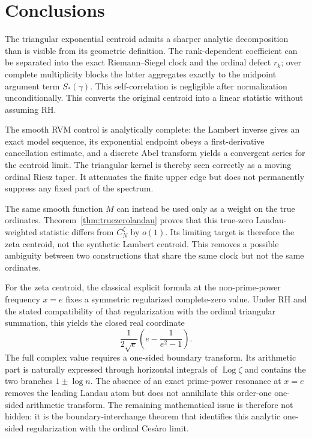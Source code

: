 \documentclass[11pt]{amsart}
\numberwithin{equation}{section}
\theoremstyle{definition}
\theoremstyle{remark}
\newcommand{\Log}{\operatorname{Log}}
\begin{document}
\section{Conclusions}\label{sec:conclusions}

The triangular exponential centroid admits a sharper analytic decomposition than is visible from its geometric definition. The rank-dependent coefficient can be separated into the exact Riemann--Siegel clock and the ordinal defect $r_k$; over complete multiplicity blocks the latter aggregates exactly to the midpoint argument term $S_*(\gamma)$. This self-correlation is negligible after normalization unconditionally. This converts the original centroid into a linear statistic without assuming RH.

The smooth RVM control is analytically complete: the Lambert inverse gives an exact model sequence, its exponential endpoint obeys a first-derivative cancellation estimate, and a discrete Abel transform yields a convergent series for the centroid limit. The triangular kernel is thereby seen correctly as a moving ordinal Riesz taper. It attenuates the finite upper edge but does not permanently suppress any fixed part of the spectrum.

The same smooth function $M$ can instead be used only as a weight on the true ordinates. Theorem~\ref{thm:truezerolandau} proves that this true-zero Landau-weighted statistic differs from $C_N^{\zeta}$ by $o(1)$. Its limiting target is therefore the zeta centroid, not the synthetic Lambert centroid. This removes a possible ambiguity between two constructions that share the same clock but not the same ordinates.

For the zeta centroid, the classical explicit formula at the non-prime-power frequency $x=e$ fixes a symmetric regularized complete-zero value. Under RH and the stated compatibility of that regularization with the ordinal triangular summation, this yields the closed real coordinate
\[
\frac{1}{2\sqrt e}\left(e-\frac1{e^2-1}\right).
\]
The full complex value requires a one-sided boundary transform. Its arithmetic part is naturally expressed through horizontal integrals of $\Log\zeta$ and contains the two branches $1\pm\log n$. The absence of an exact prime-power resonance at $x=e$ removes the leading Landau atom but does not annihilate this order-one one-sided arithmetic transform. The remaining mathematical issue is therefore not hidden: it is the boundary-interchange theorem that identifies this analytic one-sided regularization with the ordinal Cesàro limit.
\end{document}
